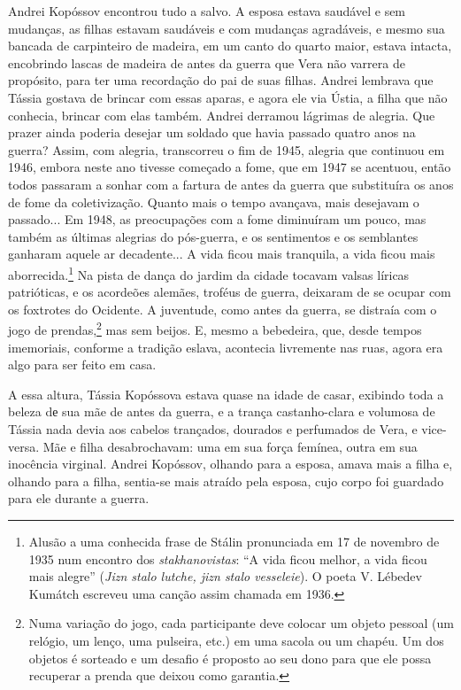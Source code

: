 Andrei Kopóssov encontrou tudo a salvo. A esposa estava saudável e sem
mudanças, as filhas estavam saudáveis e com mudanças agradáveis, e mesmo
sua bancada de carpinteiro de madeira, em um canto do quarto maior,
estava intacta, encobrindo lascas de madeira de antes da guerra que Vera
não varrera de propósito, para ter uma recordação do pai de suas filhas.
Andrei lembrava que Tássia gostava de brincar com essas aparas, e agora
ele via Ústia, a filha que não conhecia, brincar com elas também. Andrei
derramou lágrimas de alegria. Que prazer ainda poderia desejar um
soldado que havia passado quatro anos na guerra? Assim, com alegria,
transcorreu o fim de 1945, alegria que continuou em 1946, embora neste
ano tivesse começado a fome, que em 1947 se acentuou, então todos
passaram a sonhar com a fartura de antes da guerra que substituíra os
anos de fome da coletivização. Quanto mais o tempo avançava, mais
desejavam o passado... Em 1948, as preocupações com a fome diminuíram um
pouco, mas também as últimas alegrias do pós-guerra, e os sentimentos e
os semblantes ganharam aquele ar decadente... A vida ficou mais
tranquila, a vida ficou mais aborrecida.\footnote{Alusão a uma conhecida
  frase de Stálin pronunciada em 17 de novembro de 1935 num encontro dos
  \emph{stakhanovistas}: ``A vida ficou melhor, a vida ficou mais
  alegre'' (\emph{Jizn stalo lutche, jizn stalo vesseleie}). O poeta V.
  Lébedev Kumátch escreveu uma canção assim chamada em 1936.} Na pista
de dança do jardim da cidade tocavam valsas líricas patrióticas, e os
acordeões alemães, troféus de guerra, deixaram de se ocupar com os
foxtrotes do Ocidente. A juventude, como antes da guerra, se distraía
com o jogo de prendas,\footnote{Numa variação do jogo, cada participante
  deve colocar um objeto pessoal (um relógio, um lenço, uma pulseira,
  etc.) em uma sacola ou um chapéu. Um dos objetos é sorteado e um
  desafio é proposto ao seu dono para que ele possa recuperar a prenda
  que deixou como garantia.} mas sem beijos. E, mesmo a bebedeira, que,
desde tempos imemoriais, conforme a tradição eslava, acontecia
livremente nas ruas, agora era algo para ser feito em casa.

A essa altura, Tássia Kopóssova estava quase na idade de casar, exibindo
toda a beleza dе sua mãe de antes da guerra, e a trança castanho-clara e
volumosa de Tássia nada devia aos cabelos trançados, dourados e
perfumados de Vera, e vice-versa. Mãe e filha desabrochavam: uma em sua
força femínea, outra em sua inocência virginal. Andrei Kopóssov, olhando
para a esposa, amava mais a filha e, olhando para a filha, sentia-se
mais atraído pela esposa, cujo corpo foi guardado para ele durante a
guerra.

